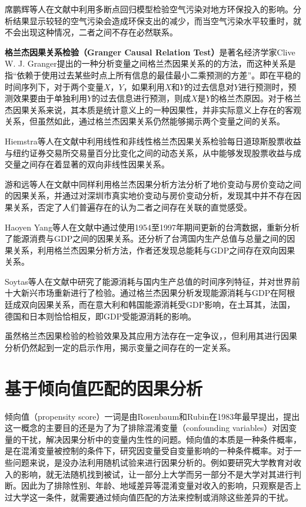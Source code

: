 席鹏辉等人在文献\cite{席鹏辉2015空气污染对地方环保投入的影响}中利用多断点回归模型检验空气污染对地方环保投入的影响。分析结果显示较轻的空气污染会造成环保支出的减少，而当空气污染水平较重时，就不会出现这种情况，二者之间不存在必然联系。


\textbf{格兰杰因果关系检验（Granger Causal Relation Test）}是著名经济学家Clive W. J. Granger提出的一种分析变量之间格兰杰因果关系的的方法，而这种关系是指“依赖于使用过去某些时点上所有信息的最佳最小二乘预测的方差”\cite{格}。即在平稳的时间序列下，对于两个变量$X，Y$，如果利用$X$和$Y$的过去信息对$Y$进行预测时，预测效果要由于单独利用$Y$的过去信息进行预测，则成$X$是$Y$的格兰杰原因\cite{格}。对于格兰杰因果关系来说，其本质是统计意义上的一种因果性，并非实际意义上存在的客观关系，但虽然如此，通过格兰杰因果关系仍然能够揭示两个变量之间的关系。

Hiemstra等人在文献\cite{hiemstra1994testing}中利用线性和非线性格兰杰因果关系检验每日道琼斯股票收益与纽约证券交易所交易量百分比变化之间的动态关系，从中能够发现股票收益与成交量之间存在着显著的双向非线性因果关系。 

游和远等人在文献\cite{游和远2007基于格兰杰因果关系检验模型的地价与房价关系分析}中同样利用格兰杰因果分析方法分析了地价变动与房价变动之间的因果关系，并通过对深圳市真实地价变动与房价变动分析，发现其中并不存在因果关系，否定了人们普遍存在的认为二者之间存在关联的直觉感受。

Haoyen Yang等人在文献\cite{yang2000note}中通过使用1954至1997年期间更新的台湾数据，重新分析了能源消费与GDP之间的因果关系。还分析了台湾国内生产总值与总量之间的因果关系，利用格兰杰因果分析方法，作者还发现总能耗与GDP之间存在双向因果关系。 

Soytas等人在文献\cite{soytas2003energy}中研究了能源消耗与国内生产总值的时间序列特征，并对世界前十大新兴市场重新进行了检验。通过格兰杰因果分析发现能源消耗与GDP在阿根廷成双向因果关系，而在意大利和韩国能源消耗受GDP影响，在土耳其，法国，德国和日本则恰恰相反，即GDP受能源消耗的影响。

虽然格兰杰因果检验的检验效果及其应用方法存在一定争议\cite{庞皓1999格兰杰因果检验的有效性及其应用}，\cite{孔凡文2010格兰杰因果关系检验模型分析与应用}，但利用其进行因果分析仍然起到一定的启示作用，揭示变量之间存在的一定关系。

\section{基于倾向值匹配的因果分析}

倾向值（propensity score）一词是由Rosenbaum和Rubin在1983年最早提出\cite{rosenbaum1983central}，提出这一概念的主要目的还是为了为了排除混淆变量（confounding variables）对因变量的干扰，解决因果分析中的变量内生性的问题。倾向值的本质是一种条件概率，是在混淆变量被控制的条件下，研究因变量受自变量影响的一种条件概率。对于一些问题来说，是没办法利用随机试验来进行因果分析的。例如要研究大学教育对收入的影响，就无法随机找到被试，让一部分上大学而另一部分不是大学对其进行判断。因此为了排除性别、年龄、地域差异等混淆变量对收入的影响，只观察是否上过大学这一条件，就需要通过倾向值匹配的方法来控制或消除这些差异的干扰。


